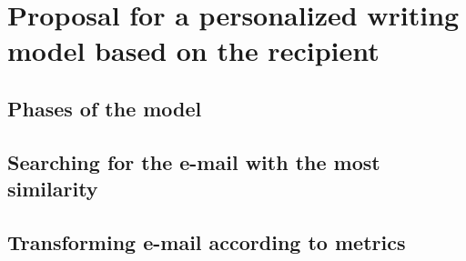 \chapter{Proposal for a personalized writing model based on the recipient}\label{cap:proposal}


\section{Phases of the model}\label{sect:phasemod}


\section{Searching for the e-mail with the most similarity}\label{sect:searchemail}


\section{Transforming e-mail according to metrics}\label{sect:transemail}
